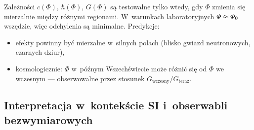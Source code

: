 \begin{problem}\label{prob:stale}
Zale\.zno\'sci $c(\Phi)$, $\hbar(\Phi)$, $G(\Phi)$ s\k{a} testowalne
tylko wtedy, gdy $\Phi$ zmienia si\k{e} mierzalnie mi\k{e}dzy r\'o\.znymi
regionami. W~warunkach laboratoryjnych $\varPhi \approx \varPhi_0$
wsz\k{e}dzie, wi\k{e}c odchylenia s\k{a} minimalne. Predykcje:
\begin{itemize}[nosep]
  \item efekty powinny by\'c mierzalne w~silnych polach
        (blisko gwiazd neutronowych, czarnych dziur),
  \item kosmologicznie: $\Phi$ w~p\'o\'znym Wszech\'swiecie
        mo\.ze r\'o\.zni\'c si\k{e} od $\Phi$ we wczesnym ---
        obserwowalne przez stosunek $G_{\mathrm{wczesny}}/G_{\mathrm{teraz}}$.
\end{itemize}
\end{problem}

\subsection{Interpretacja w~kontek\'scie SI i~obserwabli bezwymiarowych}%
\label{ssec:si-metrologia}


